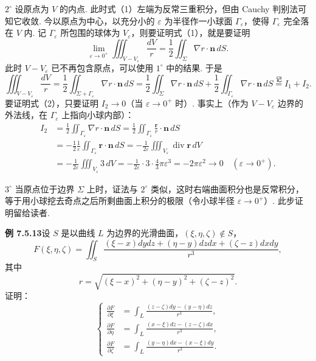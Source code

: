 \documentclass[UTF8, 12pt, fontset=fandol, oneside]{ctexart}
\providecommand{\xlongequal}[1]{\overset{#1}{=}}
\begin{document}
$2^\circ$ 设原点为 $V$ 的内点. 此时式（1）左端为反常三重积分，但由 Cauchy 判别法可知它收敛. 今以原点为中心，以充分小的 $\varepsilon$ 为半径作一小球面 $\Gamma_\varepsilon$，使得 $\Gamma_\varepsilon$ 完全落在 $V$ 内. 记 $\Gamma_\varepsilon$ 所包围的球体为 $V_\varepsilon$，则要证明式（1），就是要证明
\[
\lim_{\varepsilon\to0^+}\iiint_{V-V_\varepsilon}\frac{dV}{r}
=\frac12\iint_\Sigma\nabla r\cdot\mathbf n\,dS. \tag{2}
\]
此时 $V-V_\varepsilon$ 已不再包含原点，可以使用 $1^\circ$ 中的结果. 于是
\[
\iiint_{V-V_\varepsilon}\frac{dV}{r}
=\frac12\iint_{\Sigma+\Gamma_\varepsilon}\nabla r\cdot\mathbf n\,dS
=\frac12\iint_\Sigma\nabla r\cdot\mathbf n\,dS
+\frac12\iint_{\Gamma_\varepsilon}\nabla r\cdot\mathbf n\,dS
\xlongequal{\text{记}}I_1+I_2.
\]
要证明式（2），只要证明 $I_2\to0$（当 $\varepsilon\to0^+$ 时）. 事实上（作为 $V-V_\varepsilon$ 边界的外法线，在 $\Gamma_\varepsilon$ 上指向小球内部）：
\[
\begin{aligned}
I_2&=\frac12\iint_{\Gamma_\varepsilon}\nabla r\cdot\mathbf n\,dS
=\frac12\iint_{\Gamma_\varepsilon}\frac{\mathbf r}{r}\cdot\mathbf n\,dS\\
&=-\frac12\frac1\varepsilon\iint_{\Gamma_\varepsilon}\mathbf r\cdot\mathbf n\,dS
=-\frac1{2\varepsilon}\iiint_{V_\varepsilon}\operatorname{div}\mathbf r\,dV\\
&=-\frac1{2\varepsilon}\iiint_{V_\varepsilon}3\,dV
=-\frac1{2\varepsilon}\cdot3\cdot\frac43\pi\varepsilon^3
=-2\pi\varepsilon^2\to0\quad(\varepsilon\to0^+).
\end{aligned}
\]

$3^\circ$ 当原点位于边界 $\Sigma$ 上时，证法与 $2^\circ$ 类似，这时右端曲面积分也是反常积分，等于用小球挖去奇点之后所剩曲面上积分的极限（令小球半径 $\varepsilon\to0^+$）. 此步证明留给读者.

\noindent\textbf{例 7.5.13}\quad 设 $S$ 是以曲线 $L$ 为边界的光滑曲面，$(\xi,\eta,\zeta)\notin S$，
\[
F(\xi,\eta,\zeta)=\iint_S\frac{(\xi-x)dydz+(\eta-y)dzdx+(\zeta-z)dxdy}{r^3}, \tag{1}
\]
其中
\[
r=\sqrt{(\xi-x)^2+(\eta-y)^2+(\zeta-z)^2}.
\]
证明：
\[
\left\{
\begin{aligned}
\frac{\partial F}{\partial\xi}
&=\int_L\frac{(z-\zeta)dy-(y-\eta)dz}{r^3},\\
\frac{\partial F}{\partial\eta}
&=\int_L\frac{(x-\xi)dz-(z-\zeta)dx}{r^3},\\
\frac{\partial F}{\partial\zeta}
&=\int_L\frac{(y-\eta)dx-(x-\xi)dy}{r^3}.
\end{aligned}
\right. \tag{2}
\]
\end{document}
